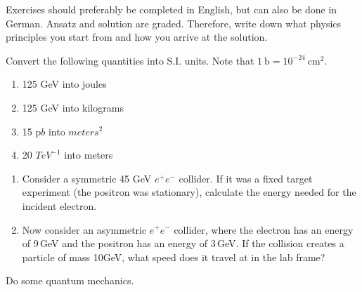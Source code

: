 \documentclass[11pt,a4paper]{article}
\begin{document}

\vspace{-5mm}

Exercises should preferably be completed in English, but can also be done in German. Ansatz and solution are graded. Therefore, write down what physics principles you start from and how you arrive at the solution.

\begin{aufgabe}[3]

Convert the following quantities into S.I. units. Note that $1~\mathrm{b} = 10^{-24}~\mathrm{cm}^{2}$.

\begin{enumerate}
\item 125 GeV into joules
\item 125 GeV into kilograms
\item 15 p$b$ into $meters^{2}$
\item 20 $TeV^{-1}$ into meters
\end{enumerate}

\end{aufgabe}

\begin{aufgabe}[10]

\begin{enumerate}
\item Consider a symmetric 45 GeV $e^{+}e^{-}$ collider. If it was a fixed target experiment (the positron was stationary), calculate the energy needed for the incident electron.
\item Now consider an asymmetric $e^{+}e^{-}$ collider, where the electron has an energy of 9\,GeV and the positron has an energy of 3\,GeV. If the collision creates a particle of mass 10GeV, what speed does it travel at in the lab frame?
\end{enumerate}

\end{aufgabe}

\begin{aufgabe}[3]

Do some quantum mechanics.

\end{aufgabe}
\end{document}
